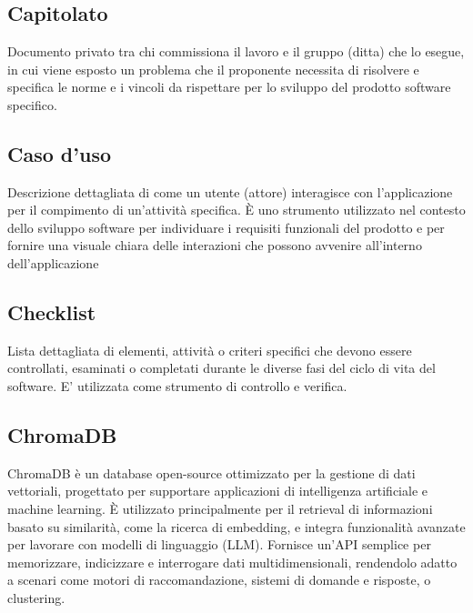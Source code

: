 \newpage




\section{}

\hypertarget{sec:capitolato}{}
\subsection*{Capitolato}
Documento privato tra chi commissiona il lavoro e il gruppo (ditta) che lo esegue, in cui viene esposto un problema che il proponente necessita di risolvere 
e specifica le norme e i vincoli da rispettare per lo sviluppo del prodotto software specifico.

\hypertarget{sec:caso_uso}{}
\subsection*{Caso d'uso}
Descrizione dettagliata di come un utente (attore) interagisce con l'applicazione per il compimento di un'attività specifica. È uno strumento utilizzato nel 
contesto dello sviluppo software per individuare i requisiti funzionali del prodotto e per fornire una visuale chiara delle interazioni che possono avvenire 
all'interno dell'applicazione

\subsection*{Checklist}
Lista dettagliata di elementi, attività o criteri specifici che devono essere controllati, esaminati o completati durante le diverse fasi del ciclo di vita 
del software. E' utilizzata come strumento di controllo e verifica.

\hypertarget{sec:chromadb}{}
\subsection*{ChromaDB}
ChromaDB è un database open-source ottimizzato per la gestione di dati vettoriali, progettato per supportare applicazioni di intelligenza artificiale e 
machine learning. È utilizzato principalmente per il retrieval di informazioni basato su similarità, come la ricerca di embedding, e integra funzionalità 
avanzate per lavorare con modelli di linguaggio (LLM). Fornisce un'API semplice per memorizzare, indicizzare e interrogare dati multidimensionali, 
rendendolo adatto a scenari come motori di raccomandazione, sistemi di domande e risposte, o clustering.

